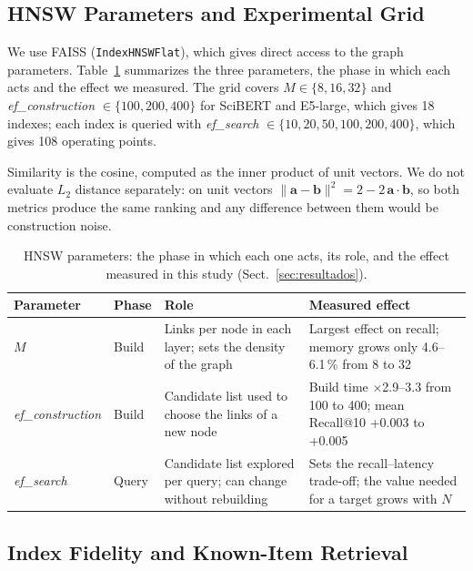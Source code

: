 \documentclass[runningheads]{llncs}
\newcommand{\efc}{\textit{ef\_construction}}
\newcommand{\efs}{\textit{ef\_search}}
\begin{document}
\subsection{HNSW Parameters and Experimental Grid}

We use FAISS \cite{ref7} (\texttt{IndexHNSWFlat}), which gives direct access to the graph
parameters. Table~\ref{tab:parametros} summarizes the three parameters, the phase in which
each acts and the effect we measured. The grid covers $M \in \{8,16,32\}$ and \efc{}
$\in \{100,200,400\}$ for SciBERT and E5-large, which gives 18 indexes; each index is queried
with \efs{} $\in \{10,20,50,100,200,400\}$, which gives 108 operating points.

Similarity is the cosine, computed as the inner product of unit vectors. We do not evaluate
$L_2$ distance separately: on unit vectors
$\lVert \mathbf{a}-\mathbf{b} \rVert^2 = 2 - 2\,\mathbf{a}\cdot\mathbf{b}$, so both metrics
produce the same ranking and any difference between them would be construction noise.

\begin{table}[tbp]
\caption{HNSW parameters: the phase in which each one acts, its role, and the effect
measured in this study (Sect.~\ref{sec:resultados}).}\label{tab:parametros}
\centering
\small
\begin{tabular}{|l|l|>{\raggedright\arraybackslash}p{3.7cm}|>{\raggedright\arraybackslash}p{3.7cm}|}
\hline
\textbf{Parameter} & \textbf{Phase} & \textbf{Role} & \textbf{Measured effect} \\
\hline
$M$ & Build & Links per node in each layer; sets the density of the graph &
Largest effect on recall; memory grows only 4.6--6.1\,\% from 8 to 32 \\
\hline
\efc{} & Build & Candidate list used to choose the links of a new node &
Build time $\times$2.9--3.3 from 100 to 400; mean Recall@10 +0.003 to +0.005 \\
\hline
\efs{} & Query & Candidate list explored per query; can change without rebuilding &
Sets the recall--latency trade-off; the value needed for a target grows with $N$ \\
\hline
\end{tabular}
\end{table}

\subsection{Index Fidelity and Known-Item Retrieval}
\end{document}
